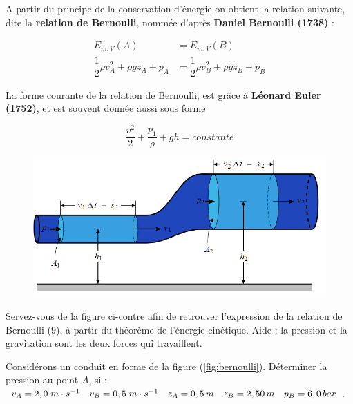 \documentclass[11pt,a4paper]{article}
\begin{document}
A partir du principe de la conservation d'énergie on obtient la relation suivante, dite la \textbf{relation de Bernoulli}, nommée d'après \textbf{Daniel Bernoulli (1738)} : 

\begin{align*}
    E_{m,V}(A) &= E_{m,V}(B) \\
    \dfrac{1}{2}\rho v_A^2 + \rho g z_A + p_A &= \dfrac{1}{2}\rho v_B^2 + \rho g z_B + p_B \tag{7}
\end{align*}

La forme courante de la relation de Bernoulli, est grâce à \textbf{Léonard Euler (1752)}, et est souvent donnée aussi sous forme 

\[ \dfrac{v^2}{2} + \dfrac{p_1}{\rho}+ gh = constante \tag{9}
\]
\newpage
\begin{exo}

\begin{figure}
    \centering
    \includegraphics[width=0.98\linewidth]{imgs/p9/bernoulli1.jpg}
\end{figure}
Servez-vous de la figure ci-contre afin de retrouver l'expression de la relation de Bernoulli (9), à partir du théorème de l'énergie cinétique. Aide :  la pression et la gravitation sont les deux forces qui travaillent. 
\vspace{9cm}
\end{exo}

\begin{exo}
Considérons un conduit en forme de la figure (\ref{fig:bernoulli}). Déterminer la pression au point $A$, si : $ v_A = 2,0\; m\cdot s^{-1} \quad v_B=0,5\; m\cdot s^{-1}\quad z_A=0,5\,m \quad z_B=2,50\,m\quad p_B=6,0\,bar$. 
\vspace{5cm}
\end{exo}
\end{document}
